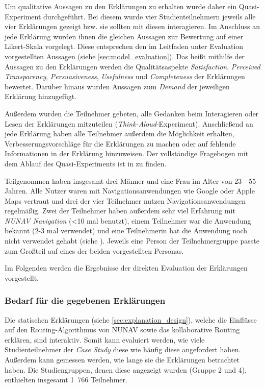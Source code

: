Um qualitative Aussagen zu den Erklärungen zu erhalten wurde daher ein Quasi-Experiment durchgeführt. Bei diesem wurde vier Studienteilnehmern jeweils alle vier Erklärungen gezeigt bzw. sie sollten mit diesen interagieren. Im Anschluss an jede Erklärung wurden ihnen die gleichen Aussagen zur Bewertung auf einer Likert-Skala vorgelegt. Diese entsprechen den im Leitfaden unter Evaluation vorgestellten Aussagen (siehe \autoref{sec:model_evaluation}). Das heißt mithilfe der Aussagen zu den Erklärungen werden die Qualitätsaspekte \textit{Satisfaction}, \textit{Perceived Transparency}, \textit{Persuasiveness}, \textit{Usefulness} und \textit{Completeness} der Erklärungen bewertet. Darüber hinaus wurden Aussagen zum \textit{Demand} der jeweiligen Erklärung hinzugefügt.

Außerdem wurden die Teilnehmer gebeten, alle Gedanken beim Interagieren oder Lesen der Erklärungen mitzuteilen (\textit{Think-Aloud}-Experiment). Anschließend an jede Erklärung haben alle Teilnehmer außerdem die Möglichkeit erhalten, Verbesserungsvorschläge für die Erklärungen zu machen oder auf fehlende Informationen in der Erklärung hinzuweisen. Der vollständige Fragebogen mit dem Ablauf des Quasi-Experiments ist in  zu finden.

Teilgenommen haben insgesamt drei Männer und eine Frau im Alter von 23 - 55 Jahren. Alle Nutzer waren mit Navigationsanwendungen wie Google oder Apple Maps vertraut und drei der vier Teilnehmer nutzen Navigationsanwendungen regelmäßig. Zwei der Teilnehmer haben außerdem sehr viel Erfahrung mit \textit{NUNAV Navigation} (<10 mal benutzt), einem Teilnehmer war die Anwendung bekannt (2-3 mal verwendet) und eine Teilnehmerin hat die Anwendung noch nicht verwendet gehabt (siehe ). Jeweils eine Person der Teilnehmergruppe passte zum Großteil auf eines der beiden vorgestellten Personas.

Im Folgenden werden die Ergebnisse der direkten Evaluation der Erklärungen vorgestellt.

\subsubsection{Bedarf für die gegebenen Erklärungen}

Die statischen Erklärungen (siehe \autoref{sec:explanation_design}), welche die Einflüsse auf den Routing-Algorithmus von NUNAV sowie das kollaborative Routing erklären, sind interaktiv. Somit kann evaluiert werden, wie viele Studienteilnehmer der \textit{Case Study} diese wie häufig diese angefordert haben. Außerdem kann gemessen werden, wie lange sie die Erklärungen betrachtet haben. Die Studiengruppen, denen diese angezeigt wurden (Gruppe 2 und 4), enthielten insgesamt 1~766 Teilnehmer.

